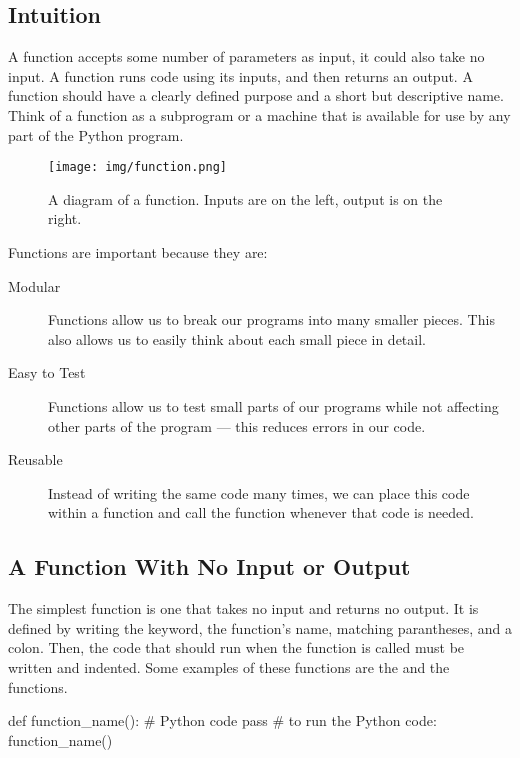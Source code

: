 \documentclass[11pt]{cselabheader}
\begin{document}
{\subsection{Intuition}

A function accepts some number of parameters as input, it could also take no input. A function runs code using
its inputs, and then returns an output.  A
function should have a clearly defined purpose and a short but
descriptive name.  Think of a function as a subprogram or a machine
that is available for use by any part of the Python program.

\begin{figure}[H]
  \begin{center}
  \texttt{[image: img/function.png]}
  \end{center}
  \caption{A diagram of a function. Inputs are on the left, output is on the right.}
\end{figure}

Functions are important because they are:

\begin{description}
  \item[Modular] Functions allow us to break our programs into many smaller pieces. This
    also allows us to easily think about each small piece in detail.
  \item[Easy to Test] Functions allow us to test small parts of our programs while not
    affecting other parts of the program --- this reduces errors in our code.
  \item[Reusable] Instead of writing the same code many times, we can place this
    code within a function and call the function whenever that code is needed.
\end{description}

\subsection{A Function With No Input or Output}

The simplest function is one that takes no input and
returns no output. It is defined by writing the
 keyword, the function's name, matching parantheses,
and a colon. Then, the code that should run when the function is called
must be written and indented. Some examples of these functions are
the  and the  functions.

\begin{python3code}
def function_name():
    # Python code
    pass
# to run the Python code:
function_name()
\end{python3code}

}
\end{document}
